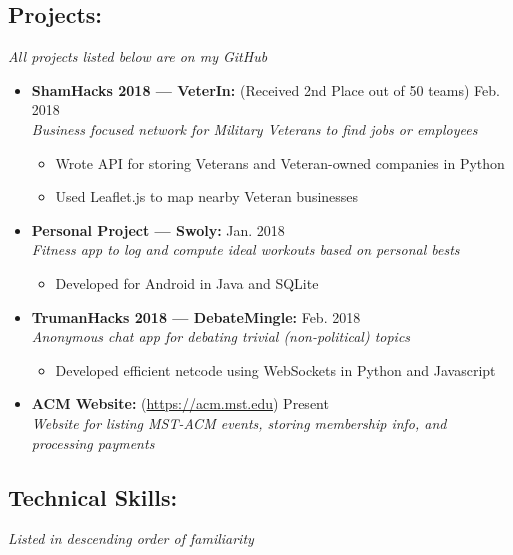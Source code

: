 \documentclass[9pt,oneside]{memoir}
\begin{document}
\subsection*{Projects:}
\vspace*{-4px}
\textit{All projects listed below are on my GitHub}
\begin{itemize}

  \item[] \textbf{ShamHacks 2018 --- VeterIn:} (Received 2nd Place out of 50 teams)
    \hfill Feb. 2018\\
    \textit{Business focused network for Military Veterans to find jobs or employees}
    \begin{itemize}
      \item[\textbullet] Wrote API for storing Veterans and Veteran-owned companies in Python
      \item[\textbullet] Used Leaflet.js to map nearby Veteran businesses
    \end{itemize}

  \item[] \textbf{Personal Project --- Swoly:}
    \hfill Jan. 2018\\
    \textit{Fitness app to log and compute ideal workouts based on personal bests}
    \begin{itemize}
      \item[\textbullet] Developed for Android in Java and SQLite
    \end{itemize}

  \item[] \textbf{TrumanHacks 2018 --- DebateMingle:}
    \hfill Feb. 2018\\
    \textit{Anonymous chat app for debating trivial (non-political) topics}
    \begin{itemize}
      \item[\textbullet] Developed efficient netcode using WebSockets in Python and Javascript
    \end{itemize}

    \item[] \textbf{ACM Website:} (\url{https://acm.mst.edu})
    \hfill Present\\
    \textit{Website for listing MST-ACM events, storing membership info, and processing payments}
  \end{itemize}

\subsection*{Technical Skills:}
\vspace*{-4px}
\textit{Listed in descending order of familiarity}
\vspace*{4px}
\end{document}
